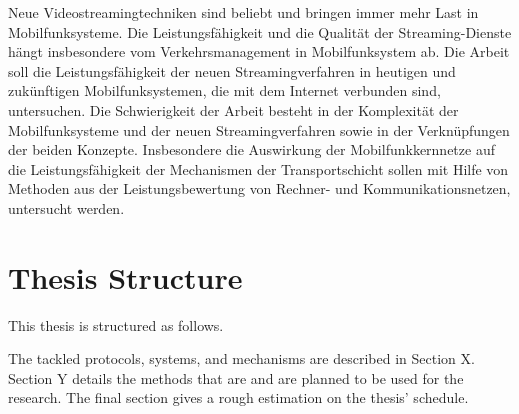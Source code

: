     Neue Videostreamingtechniken sind beliebt und bringen immer mehr Last in Mobilfunksysteme. Die Leistungsfähigkeit und die Qualität der Streaming-Dienste hängt insbesondere vom Verkehrsmanagement in Mobilfunksystem ab. Die Arbeit soll die Leistungsfähigkeit der neuen Streamingverfahren in heutigen und zukünftigen Mobilfunksystemen, die mit dem Internet verbunden sind, untersuchen. Die Schwierigkeit der Arbeit besteht in der Komplexität der Mobilfunksysteme und der neuen Streamingverfahren sowie in der Verknüpfungen der beiden Konzepte. Insbesondere die Auswirkung der Mobilfunkkernnetze auf die Leistungsfähigkeit der Mechanismen der Transportschicht sollen mit Hilfe von Methoden aus der Leistungsbewertung von Rechner- und Kommunikationsnetzen, untersucht werden.


\section{Thesis Structure}

This thesis is structured as follows.

The tackled protocols, systems, and mechanisms are described in Section X. Section Y details the methods that are and are planned to be used for the research. The final section gives a rough estimation on the thesis' schedule.





